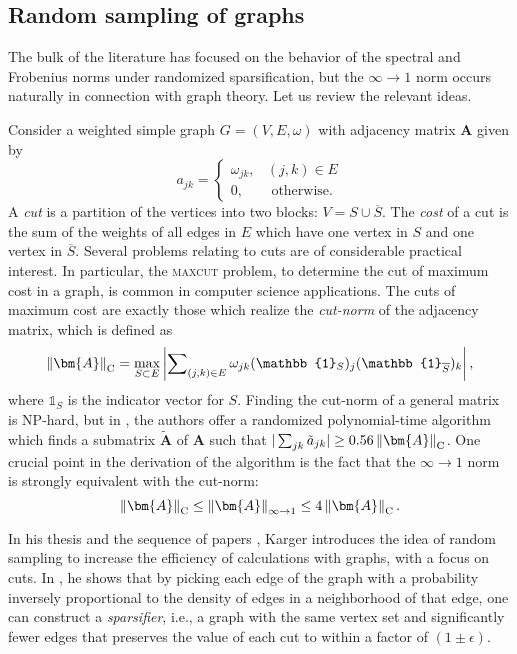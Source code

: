 \documentclass[11pt,letterpaper,twoside,reqno]{amsart}
\newcommand{\mat}[1]{\ensuremath{\bm{#1}}}
\newcommand{\infonorm}[1]{\ensuremath{\left\|#1\right\|_{\infty\rightarrow 1}}}
\newcommand{\infone}{\ensuremath{\infty\!\rightarrow\!\!1}}
\newcommand{\cutnorm}[1]{\ensuremath{\left\|#1\right\|_{\text{\rm C}}}}
\begin{document}
\subsection{Random sampling of graphs}
The bulk of the literature has focused on the behavior of the spectral and Frobenius norms under randomized sparsification, but the $\infone$ norm occurs naturally in connection with graph theory. Let us review the relevant ideas.

Consider a weighted simple graph $G=(V,E,\omega)$ with adjacency matrix
$\mat{A}$ given by 
\[
a_{jk}=\begin{cases}
\omega_{jk}, & (j,k)\in E\\
0, & \text{ otherwise}.\end{cases}
\]
A \emph{cut} is a partition of the vertices into two blocks: $V=S\cup\overline{S}$. The \emph{cost} of a cut is the sum of the weights of all edges in $E$ which have one vertex in $S$ and one vertex in
$\overline{S}$.
Several problems relating to cuts are of considerable practical interest. In particular, the \textsc{maxcut} problem, to determine the cut of maximum cost in a graph, is common in computer science applications. The cuts of maximum cost are exactly those which realize the \emph{cut-norm} of the adjacency matrix, which is defined as 
\[
\cutnorm{\mat{A}}=\max_{S\subset E}\left|\sum\nolimits_{(j,k)\in E}\omega_{jk}(\mathbb{1}_{S})_{j}(\mathbb{1}_{\overline{S}})_{k}\right|,
\]
where $\mathbb{1}_{S}$ is the indicator vector for $S$. Finding the cut-norm of a general matrix is {\sf NP}-hard, but in \cite{AN04}, the authors offer a randomized polynomial-time algorithm which finds a submatrix $\tilde{\mat{A}}$ of $\mat{A}$ such that $|\sum_{jk}\tilde{a}_{jk}|\geq0.56\cutnorm{\mat{A}}$. One crucial point in the derivation of the algorithm is the fact that
the $\infone$ norm is strongly equivalent with the cut-norm: 
\[
\cutnorm{\mat{A}}\leq\infonorm{\mat{A}}\leq4\cutnorm{\mat{A}}.
\]

In his thesis \cite{Kar95th} and the sequence of papers \cite{Kar94a,Kar94b,Kar96}, Karger introduces the idea of random sampling to increase the efficiency of calculations with graphs, with a focus on cuts. In \cite{Kar96}, he shows that by picking each edge of the graph with a probability inversely proportional to the density of edges in a neighborhood of that edge, one can construct a \emph{sparsifier}, i.e., a graph with the same vertex set and significantly fewer edges that preserves the value of each cut to within a factor of $(1\pm\epsilon)$.
\end{document}
